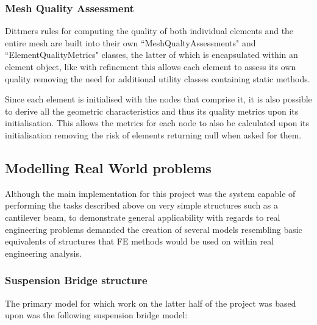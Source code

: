 \documentclass{article}
\begin{document}
\subsubsection{Mesh Quality Assessment}
Dittmers rules for computing the quality of both individual elements and the entire mesh are built into their own ``MeshQualtyAssessments" and ``ElementQualityMetrics" classes, the latter of which is encapsulated within an element object, like with refinement this allows each element to assess its own quality removing the need for additional utility classes containing static methods. 

Since each element is initialised with the nodes that comprise it, it is also possible to derive all the geometric characteristics and thus its quality metrics upon its initialisation. This allows the metrics for each node to also be calculated upon its initialisation removing the risk of elements returning null when asked for them.


\subsection{Modelling Real World problems}
Although the main implementation for this project was the system capable of performing the tasks described above on very simple structures such as a cantilever beam, to demonstrate general applicability with regards to real engineering problems demanded the creation of several models resembling basic equivalents of structures that FE methods would be used on within real engineering analysis.

\subsubsection{Suspension Bridge structure}

\noindent
The primary model for which work on the latter half of the project was based upon was the following suspension bridge model:
\end{document}
